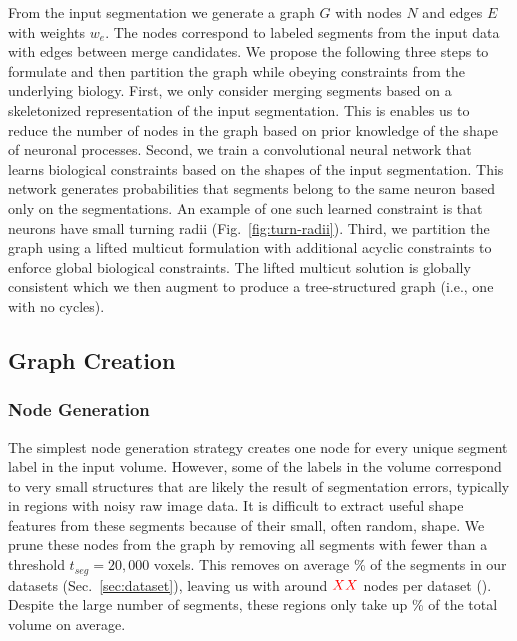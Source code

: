 From the input segmentation we generate a graph $G$ with nodes $N$ and edges $E$ with weights $w_e$. 
The nodes correspond to labeled segments from the input data with edges between merge candidates.
We propose the following three steps to formulate and then partition the graph while obeying constraints from the underlying biology.
First, we only consider merging segments based on a skeletonized representation of the input segmentation.
This is enables us to reduce the number of nodes in the graph based on prior knowledge of the shape of neuronal processes.
Second, we train a convolutional neural network that learns biological constraints based on the shapes of the input segmentation.
This network generates probabilities that segments belong to the same neuron based only on the segmentations. 
An example of one such learned constraint is that neurons have small turning radii (Fig.~\ref{fig:turn-radii}).
Third, we partition the graph using a lifted multicut formulation with additional acyclic constraints to enforce global biological constraints.
The lifted multicut solution is globally consistent which we then augment to produce a tree-structured graph (i.e., one with no cycles).

\subsection{Graph Creation}
\label{sec:skeletonization}

\subsubsection{Node Generation}

The simplest node generation strategy creates one node for every unique segment label in the input volume. 
However, some of the labels in the volume correspond to very small structures that are likely the result of segmentation errors, typically in regions with noisy raw image data. 
It is difficult to extract useful shape features from these segments because of their small, often random, shape. 
We prune these nodes from the graph by removing all segments with fewer than a threshold $t_{seg} = 20,000$ voxels. 
This removes on average \% of the segments in our  datasets (Sec.~\ref{sec:dataset}), leaving us with around $\textcolor{red}{XX}$ nodes per dataset (). 
Despite the large number of segments, these regions only take up \% of the total volume on average.

